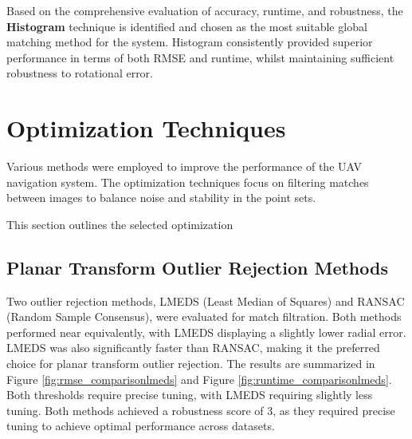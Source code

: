 Based on the comprehensive evaluation of accuracy, runtime, and robustness, the \textbf{Histogram} technique is identified and chosen as the most suitable global matching method for the system. Histogram consistently provided superior performance in terms of both RMSE and runtime, whilst maintaining sufficient robustness to rotational error. 




\section{Optimization Techniques}
Various methods were employed to improve the performance of the UAV navigation system. The optimization techniques focus on filtering matches between images to balance noise and stability in the point sets. 


This section outlines the selected optimization 

\subsection{Planar Transform Outlier Rejection Methods}

Two outlier rejection methods, LMEDS (Least Median of Squares) and RANSAC (Random Sample Consensus), were evaluated for match filtration. Both methods performed near equivalently, with LMEDS displaying a slightly lower radial error. LMEDS was also significantly faster than RANSAC, making it the preferred choice for planar transform outlier rejection. The results are summarized in Figure \ref{fig:rmse_comparisonlmeds} and Figure \ref{fig:runtime_comparisonlmeds}. Both thresholds require precise tuning, with LMEDS requiring slightly less tuning. Both methods achieved a robustness score of 3, as they required precise tuning to achieve optimal performance across datasets.

